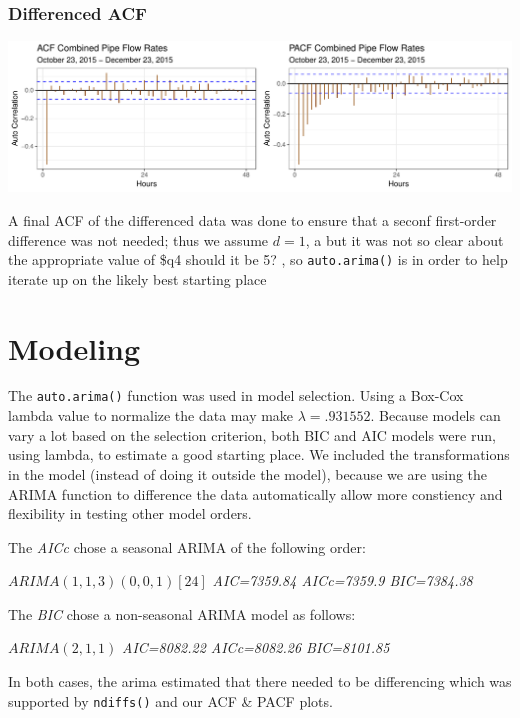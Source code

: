 \documentclass[openany]{book}
\begin{document}
\hypertarget{differenced-acf}{%
\subsubsection{Differenced ACF}\label{differenced-acf}}

\includegraphics{Group2_Project1_Fall2019_files/figure-latex/unnamed-chunk-19-1.pdf}

A final ACF of the differenced data was done to ensure that a seconf
first-order difference was not needed; thus we assume \(d = 1\), a but
it was not so clear about the appropriate value of \$q4 should it be 5?
, so \texttt{auto.arima()} is in order to help iterate up on the likely
best starting place

\hypertarget{modeling-2}{%
\section{Modeling}\label{modeling-2}}

The \texttt{auto.arima()} function was used in model selection. Using a
Box-Cox lambda value to normalize the data may make
\(\lambda= .931552\). Because models can vary a lot based on the
selection criterion, both BIC and AIC models were run, using lambda, to
estimate a good starting place. We included the transformations in the
model (instead of doing it outside the model), because we are using the
ARIMA function to difference the data automatically allow more
constiency and flexibility in testing other model orders.

The \emph{AICc} chose a seasonal ARIMA of the following order:

\(ARIMA(1,1,3)(0,0,1)[24]\) \emph{AIC=7359.84 AICc=7359.9 BIC=7384.38}

The \emph{BIC} chose a non-seasonal ARIMA model as follows:

\(ARIMA(2,1,1)\) \emph{AIC=8082.22 AICc=8082.26 BIC=8101.85}

In both cases, the arima estimated that there needed to be differencing
which was supported by \texttt{ndiffs()} and our ACF \& PACF plots.
\end{document}
